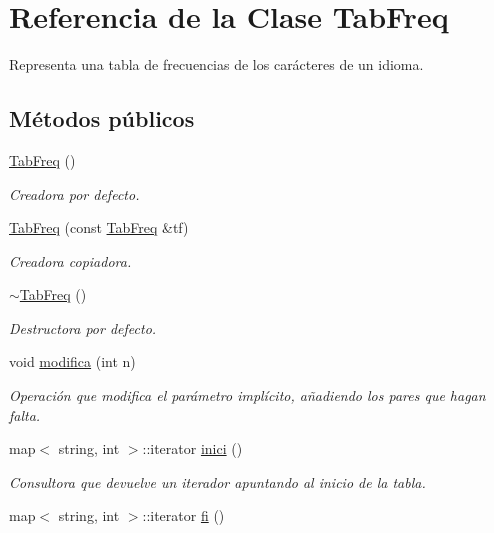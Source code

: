 \hypertarget{class_tab_freq}{}\section{Referencia de la Clase Tab\+Freq}
\label{class_tab_freq}


Representa una tabla de frecuencias de los carácteres de un idioma.  


\subsection*{Métodos públicos}
\begin{DoxyCompactItemize}
\item 
\hyperlink{class_tab_freq_a0e429dc751718b7fc1c6ad3e127a0f98}{Tab\+Freq} ()
\begin{DoxyCompactList}\small\item\em Creadora por defecto. \end{DoxyCompactList}\item 
\hyperlink{class_tab_freq_a9080ea66c71746520f33a542e56dabb0}{Tab\+Freq} (const \hyperlink{class_tab_freq}{Tab\+Freq} \&tf)
\begin{DoxyCompactList}\small\item\em Creadora copiadora. \end{DoxyCompactList}\item 
\hyperlink{class_tab_freq_a5e97d572cc5d1d46c6a16cf76e94c698}{$\sim$\+Tab\+Freq} ()
\begin{DoxyCompactList}\small\item\em Destructora por defecto. \end{DoxyCompactList}\item 
void \hyperlink{class_tab_freq_a78f5e7e73648d2a7ecc0bd28f4cbd4c0}{modifica} (int n)
\begin{DoxyCompactList}\small\item\em Operación que modifica el parámetro implícito, añadiendo los pares que hagan falta. \end{DoxyCompactList}\item 
map$<$ string, int $>$\+::iterator \hyperlink{class_tab_freq_a4c139f7774cf70aa67d354f7f4d3ae87}{inici} ()
\begin{DoxyCompactList}\small\item\em Consultora que devuelve un iterador apuntando al inicio de la tabla. \end{DoxyCompactList}\item 
map$<$ string, int $>$\+::iterator \hyperlink{class_tab_freq_acaa682bda54944915db86e012756cef8}{fi} ()

\end{DoxyCompactItemize}
